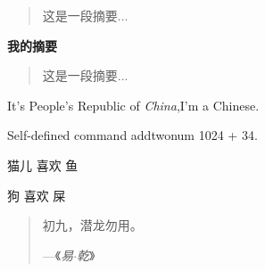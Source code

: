 \documentclass{article}
\newcommand\PRC{People's Republic of \emph{China}}
\newcommand\addtwonum[2][1024]{#1 + #2}  %
\newcommand*{\love}[3][喜欢]{#2 #1 #3} %
\newcommand\loves[3][喜欢]{#2 #1 #3}
\newenvironment{myabstract}[1][摘要]
{\small
	\begin{center}\bfseries #1\end{center}
	\begin{quotation}}
	{\end{quotation}
}
\newenvironment{Quotation}[1]
{\newcommand\quotesource{#1} %
	\begin{quotation}}
	{\par\hfill---《\textit{\quotesource}》
	\end{quotation}
}
\begin{document}
	\begin{abstract}
		这是一段摘要...
	\end{abstract}
	
	\begin{myabstract}[我的摘要]
		这是一段摘要...
	\end{myabstract}
	It's \PRC,I'm a Chinese.
	
	Self-defined command addtwonum \addtwonum{3}{4}.
	
	\love{猫儿}{鱼}
	
	\loves{狗}{屎}
	
	\begin{Quotation}{易$ \cdot $乾}
		初九，潜龙勿用。
	\end{Quotation}
	
\end{document}
